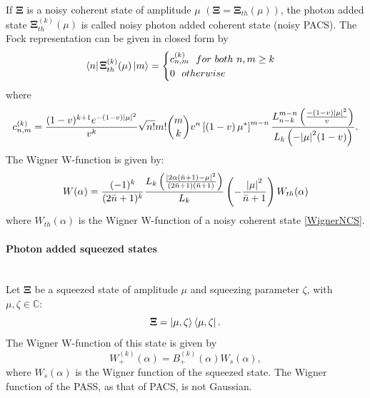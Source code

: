         If $\pmb{\Xi}$ is a noisy coherent state of amplitude $\mu$ $(\pmb{\Xi}=\pmb{\Xi}_{th}(\mu))$,
        the photon added state $\pmb{\Xi}_{th}^{(k)}(\mu)$ is called noisy photon added coherent state
        (noisy PACS).
        The Fock representation can be given in closed form by \cite{PACSDisc}
        \begin{equation}
            \bra{n}\pmb{\Xi}_{th}^{(k)}(\mu)\ket{m}=
            \begin{cases}
                c_{n,m}^{(k)}\ \ for\ both\ n,m \geq k\\
                0\ \ otherwise
            \end{cases}
        \end{equation}
        where
        \begin{equation*}
            c_{n,m}^{(k)}=\frac{(1-v)^{k+1}e^{-(1-v)\absolutevalue{\mu}^2}}{v^k}
            \sqrt{n!}{m!}\binom{m}{k} v^n \left[\left(1-v\right)\mu^*\right]^{m-n}
            \frac{L^{m-n}_{n-k} \left( \frac{-(1-v)\absolutevalue{\mu}^2}{v} \right)}
            {L_k \left( -\absolutevalue{\mu}^2 (1-v) \right)}.
        \end{equation*}
        The Wigner W-function is given by:
        \begin{equation}
            W(\alpha)=\frac{(-1)^k}{(2\bar{n}+1)^k}\frac{L_k \left( 
                \frac{\absolutevalue{2\alpha(\bar{n}+1)-\mu}^2}{(2\bar{n}+1)(\bar{n}+1)} \right)}
                {L_k} \left(-\frac{\absolutevalue{\mu}^2}{\bar{n}+1} \right) W_{th}(\alpha)
        \end{equation}
        where $W_{th}(\alpha)$ is the Wigner W-function of a noisy coherent state \ref{WignerNCS}.
        
        \paragraph{Photon added squeezed states}\mbox{}\\
        Let $\pmb{\Xi}$ be a squeezed state of amplitude $\mu$ and squeezing parameter $\zeta$,
        with $\mu,\zeta \in \mathbb{C}$:
        \begin{equation*}
            \pmb{\Xi}=\ket{\mu,\zeta}\bra{\mu,\zeta}.
        \end{equation*}
        The Wigner W-function of this state is given by
        \begin{equation}
            W_+^{(k)}(\alpha) = B_+^{(k)}(\alpha) W_s(\alpha),
        \end{equation}
        where $W_s(\alpha)$ is the Wigner function of the squeezed state.
        The Wigner function of the PASS, as that of PACS, is not Gaussian.

